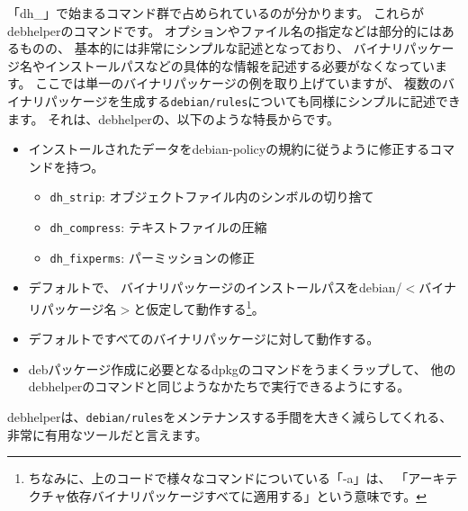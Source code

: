 \documentclass[mingoth,a4paper]{jsarticle}
\begin{document}

「dh\_」で始まるコマンド群で占められているのが分かります。
これらがdebhelperのコマンドです。
オプションやファイル名の指定などは部分的にはあるものの、
基本的には非常にシンプルな記述となっており、
バイナリパッケージ名やインストールパスなどの具体的な情報を記述する必要がなくなっています。
ここでは単一のバイナリパッケージの例を取り上げていますが、
複数のバイナリパッケージを生成する\texttt{debian/rules}についても同様にシンプルに記述できます。
それは、debhelperの、以下のような特長からです。

\begin{itemize}
 \item インストールされたデータをdebian-policyの規約に従うように修正するコマンドを持つ。
\begin{itemize}
 \item \texttt{dh\_strip}: オブジェクトファイル内のシンボルの切り捨て
 \item \texttt{dh\_compress}: テキストファイルの圧縮
 \item \texttt{dh\_fixperms}: パーミッションの修正
\end{itemize} 
\item デフォルトで、
  バイナリパッケージのインストールパスをdebian/$<$バイナリパッケージ名$>$と仮定して動作する\footnote{ちなみに、上のコードで様々なコマンドについている「-a」は、
  「アーキテクチャ依存バイナリパッケージすべてに適用する」という意味です。}。
 \item デフォルトですべてのバイナリパッケージに対して動作する。
 \item debパッケージ作成に必要となるdpkgのコマンドをうまくラップして、
  他のdebhelperのコマンドと同じようなかたちで実行できるようにする。
\end{itemize}

debhelperは、\texttt{debian/rules}をメンテナンスする手間を大きく減らしてくれる、
非常に有用なツールだと言えます。
\end{document}
